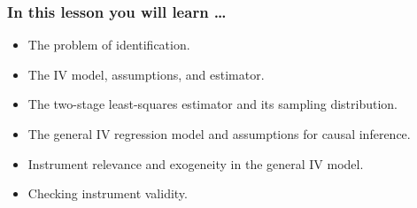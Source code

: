 

\begin{frame}
\frametitle{In this lesson you will learn \dots}
\begin{itemize}
\item The problem of identification.
\item The IV model, assumptions, and estimator.
\item The two-stage least-squares estimator and its sampling distribution.
\item The general IV regression model and assumptions for causal inference.
\item Instrument relevance and exogeneity in the general IV model. 
\item Checking instrument validity. 
\end{itemize}
\end{frame}

